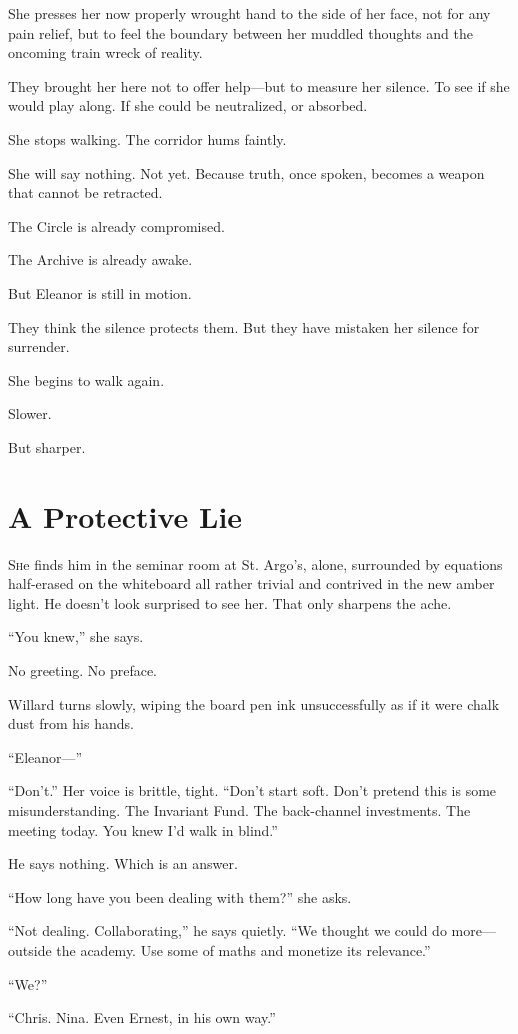 She presses her now properly wrought hand to the side of her face, not for any pain relief, but to feel the boundary between her muddled thoughts and the oncoming train wreck of reality.

They brought her here not to offer help—but to measure her silence. To see if she would play along. If she could be neutralized, or absorbed.

She stops walking. The corridor hums faintly.

She will say nothing. Not yet. Because truth, once spoken, becomes a weapon that cannot be retracted.

The Circle is already compromised.

The Archive is already awake.

But Eleanor is still in motion.

They think the silence protects them. But they have mistaken her silence for surrender.

She begins to walk again.

Slower.

But sharper.
\section*{A Protective Lie}
\lettrine{S}he finds him in the seminar room at St. Argo’s, alone, surrounded by equations half-erased on the whiteboard all rather trivial and contrived in the new amber light. He doesn’t look surprised to see her. That only sharpens the ache.

“You knew,” she says.

No greeting. No preface.

Willard turns slowly, wiping the board pen ink unsuccessfully as if it were chalk dust from his hands.

“Eleanor—”

“Don’t.” Her voice is brittle, tight. “Don’t start soft. Don’t pretend this is some misunderstanding. The Invariant Fund. The back-channel investments. The meeting today. You knew I’d walk in blind.”

He says nothing.
Which is an answer.

“How long have you been dealing with them?” she asks.

“Not dealing. Collaborating,” he says quietly. “We thought we could do more—outside the academy. Use some of maths and monetize its relevance.”

“We?”

“Chris. Nina. Even Ernest, in his own way.”

